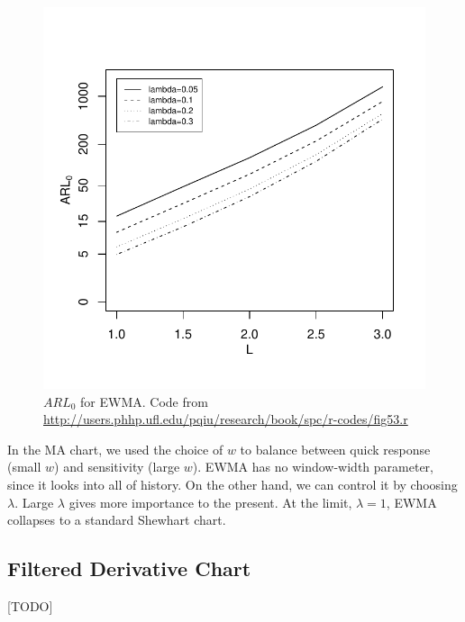 \begin{figure}[h]
\centering
\includegraphics[height=0.3\textheight]{art/fig53}
\caption[$ARL_0$ for EWMA]{$ARL_0$ for EWMA. \newline Code from \url{http://users.phhp.ufl.edu/pqiu/research/book/spc/r-codes/fig53.r}}
\label{fig:arl_0_ewma}
\end{figure}

In the MA chart, we used the choice of $w$ to balance between quick response (small $w$) and sensitivity (large $w$).
EWMA has no window-width parameter, since it looks into all of history. On the other hand, we can control it by choosing $\lambda$. 
Large $\lambda$ gives more importance to the present. At the limit, $\lambda=1$, EWMA collapses to a standard Shewhart chart.







\subsection{Filtered Derivative Chart}
[TODO]


